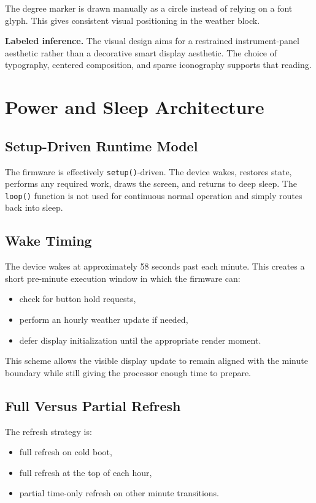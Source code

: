 \documentclass[11pt]{article}
\begin{document}
The degree marker is drawn manually as a circle instead of relying on a font glyph. This gives consistent visual positioning in the weather block.

\textbf{Labeled inference.} The visual design aims for a restrained instrument-panel aesthetic rather than a decorative smart display aesthetic. The choice of typography, centered composition, and sparse iconography supports that reading.

\section{Power and Sleep Architecture}
\subsection{Setup-Driven Runtime Model}
The firmware is effectively \texttt{setup()}-driven. The device wakes, restores state, performs any required work, draws the screen, and returns to deep sleep. The \texttt{loop()} function is not used for continuous normal operation and simply routes back into sleep.

\subsection{Wake Timing}
The device wakes at approximately 58 seconds past each minute. This creates a short pre-minute execution window in which the firmware can:
\begin{itemize}
  \item check for button hold requests,
  \item perform an hourly weather update if needed,
  \item defer display initialization until the appropriate render moment.
\end{itemize}

This scheme allows the visible display update to remain aligned with the minute boundary while still giving the processor enough time to prepare.

\subsection{Full Versus Partial Refresh}
The refresh strategy is:
\begin{itemize}
  \item full refresh on cold boot,
  \item full refresh at the top of each hour,
  \item partial time-only refresh on other minute transitions.
\end{itemize}
\end{document}
